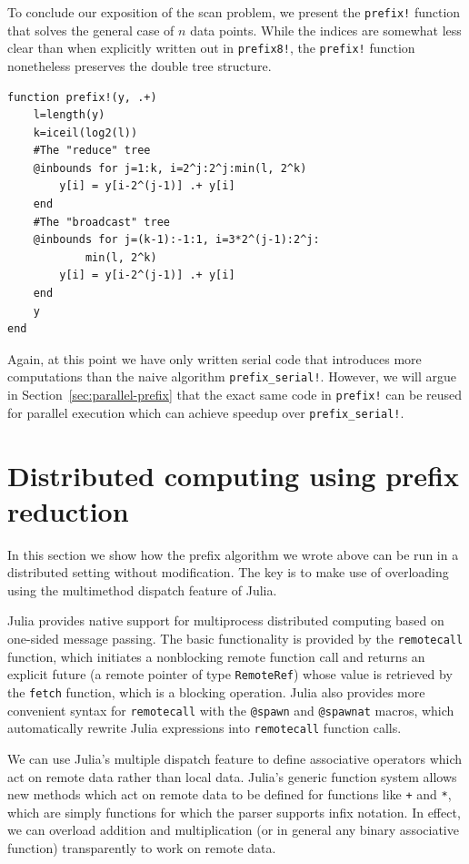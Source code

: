 \documentclass{sig-alternate}
\newcommand{\code}[1]{\texttt{#1}}
\begin{document}
To conclude our exposition of the scan problem, we present the \code{prefix!}
function that solves the general case of $n$ data points. While the indices are
somewhat less clear than when explicitly written out in \code{prefix8!}, the
\code{prefix!} function nonetheless preserves the double tree structure.

\begin{verbatim}
function prefix!(y, .+)
    l=length(y)
    k=iceil(log2(l))
    #The "reduce" tree
    @inbounds for j=1:k, i=2^j:2^j:min(l, 2^k)
        y[i] = y[i-2^(j-1)] .+ y[i]
    end
    #The "broadcast" tree
    @inbounds for j=(k-1):-1:1, i=3*2^(j-1):2^j:
            min(l, 2^k)
        y[i] = y[i-2^(j-1)] .+ y[i]
    end
    y
end
\end{verbatim}

Again, at this point we have only written serial code that introduces more
computations than the naive algorithm \code{prefix\allowbreak\_serial!}. However, we will
argue in Section~\ref{sec:parallel-prefix} that the exact same code in
\code{prefix!} can be reused for parallel execution which can achieve speedup
over \code{prefix\allowbreak\_serial!}.

\section{Distributed computing using prefix reduction}

In this section we show how the prefix algorithm we wrote above can be run in a
distributed setting without modification. The key is to make use of overloading
using the multimethod dispatch feature of Julia.

Julia provides native support for multiprocess distributed computing based on
one-sided message passing. The basic functionality is provided by the
\code{remotecall} function, which initiates a nonblocking remote function call
and returns an explicit future (a remote pointer of type \code{RemoteRef})
whose value is retrieved by the \code{fetch} function, which is a blocking
operation. Julia also provides more convenient syntax for \code{remotecall}
with the \code{@spawn} and \code{@spawnat} macros, which automatically rewrite
Julia expressions into \code{remotecall} function calls.

We can use Julia's multiple dispatch feature to define associative operators
which act on remote data rather than local data. Julia's generic function
system allows new methods which act on remote data to be defined for functions
like \code{+} and \code{*}, which are simply functions for which the parser
supports infix notation. In effect, we can overload addition and multiplication
(or in general any binary associative function) transparently to work on remote
data.
\end{document}
